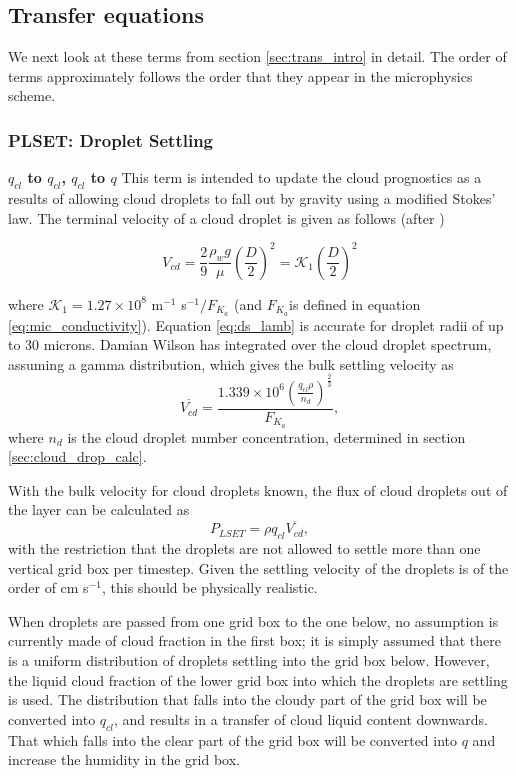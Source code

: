 \documentclass{UMDP_article}
\def\bq{\begin{equation}}
\def\eq{\end{equation}}
\begin{document}
\subsection{Transfer equations}
\label{sec:trans_eqs}

We next look at these terms from section \ref{sec:trans_intro} in detail. 
The order of terms approximately follows the order that they appear in the 
microphysics scheme.

\subsubsection{PLSET: Droplet Settling}
\label{sec:PLSET}

\textbf{$q_{cl}$ to $q_{cl}$, $q_{cl}$ to $q$}
This term is intended to update the cloud prognostics as a results of allowing
cloud droplets to fall out by gravity using a modified Stokes' law. The terminal
velocity of a cloud droplet is given as follows 
(after \citealp{Lamb:1994, Rogers:Yau:1989})

\bq
\label{eq:ds_lamb}
V_{cd} = \frac{2}{9} \frac{\rho_w g}{\mu} \left(\frac{D}{2}\right)^2 
       = \mathcal{K}_1 \left(\frac{D}{2}\right)^2
\eq

where $\mathcal{K}_1 = 1.27 \times 10^8$ m$^{-1}$ s$^{-1} /F_{K_{a}}$ 
(and $F_{K_{a}}$is defined in equation \ref{eq:mic_conductivity}). Equation
\ref{eq:ds_lamb} is accurate for droplet radii of up to 30 microns.
Damian Wilson has integrated over the cloud droplet spectrum, assuming a
\cite{Khrgian:Mazin:1952} gamma distribution, which gives the bulk settling 
velocity as
\bq
\label{eq:ds_spec}
\overline{V_{cd}} = \frac{1.339 \times 10^6 
\left(\frac{q_{cl} \rho}{n_{d}}\right)^{\frac{2}{3}}}{F_{K_a}},
\eq
where $n_d$ is the cloud droplet number concentration, determined in section 
\ref{sec:cloud_drop_calc}.

With the bulk velocity for cloud droplets known, the flux of cloud droplets out
of the layer can be calculated as 
\bq
\label{eq:ds_flux}
P_{LSET} = \rho q_{cl}\overline{V_{cd}},
\eq
with the restriction that the droplets are not allowed to settle more than one
vertical grid box per timestep. Given the settling velocity of the droplets is
of the order of cm s$^{-1}$, this should be physically realistic. 

When droplets are passed from one grid box to the one below, no assumption is 
currently made of cloud fraction in the first box; it is simply assumed that
there is a uniform distribution of droplets settling into the grid box below.
However, the liquid cloud fraction of the lower grid box into which the 
droplets are settling is used. The distribution that falls into the cloudy
part of the grid box will be converted into $q_{cl}$, and results in a transfer
of cloud liquid content downwards. That which falls into
the clear part of the grid box will be converted into $q$ and increase the 
humidity in the grid box.
\end{document}
